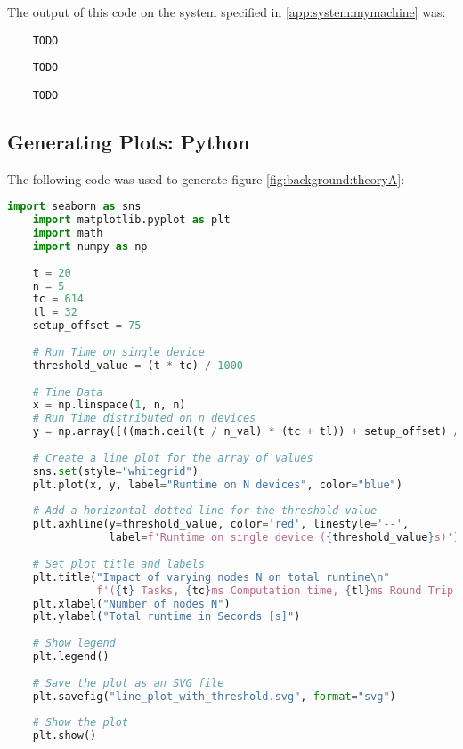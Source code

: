 The output of this code on the system specified in \ref{app:system:mymachine} was:
\begin{lstlisting}
    TODO
\end{lstlisting}
\begin{lstlisting}
    TODO
\end{lstlisting}
\begin{lstlisting}
    TODO
\end{lstlisting}

\subsection{Generating Plots: Python}
\label{app:code:theoryplots}

The following code was used to generate figure \ref{fig:background:theoryA}:
\begin{lstlisting}[language=Python, frame=tb, caption={Ploting execution time (variable nodes)}]
    import seaborn as sns
    import matplotlib.pyplot as plt
    import math
    import numpy as np
    
    t = 20
    n = 5
    tc = 614
    tl = 32
    setup_offset = 75
    
    # Run Time on single device
    threshold_value = (t * tc) / 1000
    
    # Time Data
    x = np.linspace(1, n, n)
    # Run Time distributed on n devices
    y = np.array([((math.ceil(t / n_val) * (tc + tl)) + setup_offset) / 1000 for n_val in x])
    
    # Create a line plot for the array of values
    sns.set(style="whitegrid")
    plt.plot(x, y, label="Runtime on N devices", color="blue")
    
    # Add a horizontal dotted line for the threshold value
    plt.axhline(y=threshold_value, color='red', linestyle='--',
                label=f'Runtime on single device ({threshold_value}s)')
    
    # Set plot title and labels
    plt.title("Impact of varying nodes N on total runtime\n"
              f'({t} Tasks, {tc}ms Computation time, {tl}ms Round Trip Time, {setup_offset}ms Offset)')
    plt.xlabel("Number of nodes N")
    plt.ylabel("Total runtime in Seconds [s]")
    
    # Show legend
    plt.legend()
    
    # Save the plot as an SVG file
    plt.savefig("line_plot_with_threshold.svg", format="svg")
    
    # Show the plot
    plt.show()
\end{lstlisting}

